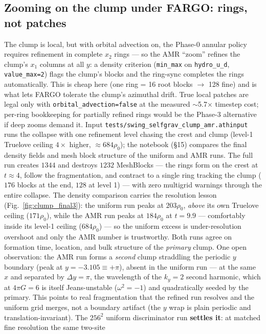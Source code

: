 \documentclass[11pt]{article}
\newcommand{\code}[1]{\texttt{#1}}
\begin{document}
\subsection{Zooming on the clump under FARGO: rings, not patches}
\label{sec:collapse_amr}
The clump is local, but with orbital advection on, the Phase-0 annular policy
requires refinement in complete $x_2$ rings --- so the AMR ``zoom'' refines the
clump's $x_1$ columns at all $y$: a density criterion
(\code{min\_max} on \code{hydro\_u\_d}, \code{value\_max=2}) flags the clump's
blocks and the ring-sync completes the rings automatically. This is cheap here
(one ring = 16 root blocks $\to$ 128 fine) and is what lets FARGO tolerate the
clump's azimuthal drift. True local patches are legal only with
\code{orbital\_advection=false} at the measured $\sim$5.7$\times$ timestep
cost; per-ring bookkeeping for partially refined rings would be the Phase-3
alternative if deep zooms demand it.
Input \code{tests/swing\_selfgrav\_clump\_amr.athinput} runs the collapse with
one refinement level chasing the crest and clump (level-1 Truelove ceiling
$4\times$ higher, $\approx 684\rho_0$); the notebook (\S15) compares the final
density fields and mesh block structure of the uniform and AMR runs.
The full run creates $1344$ and destroys $1232$ MeshBlocks --- the rings form
on the crest at $t \approx 4$, follow the fragmentation, and contract to a
single ring tracking the clump ($176$ blocks at the end, $128$ at level 1) ---
with zero multigrid warnings through the entire collapse. The density
comparison carries the resolution lesson (Fig.~\ref{fig:clump_final3}): the
uniform run peaks at $203\rho_0$, \emph{above} its own Truelove ceiling
($171\rho_0$), while the AMR run peaks at $184\rho_0$ at $t=9.9$ --- comfortably
inside its level-1 ceiling ($684\rho_0$) --- so the uniform excess is
under-resolution overshoot and only the AMR number is trustworthy. Both runs
agree on formation time, location, and bulk structure of the \emph{primary}
clump. One open observation: the AMR run forms a \emph{second} clump straddling
the periodic $y$ boundary (peak at $y = -3.105 \equiv +\pi$), absent in the
uniform run --- at the same $x$ and separated by $\Delta y = \pi$, the
wavelength of the $k_y{=}2$ second harmonic, which at $4\pi G = 6$ is itself
Jeans-unstable ($\omega^2 = -1$) and quadratically seeded by the primary. This
points to real fragmentation that the refined run resolves and the uniform grid
merges, not a boundary artifact (the $y$ wrap is plain periodic and
translation-invariant). The $256^2$ uniform discriminator run \textbf{settles
it}: at matched fine resolution the same two-site
\end{document}
